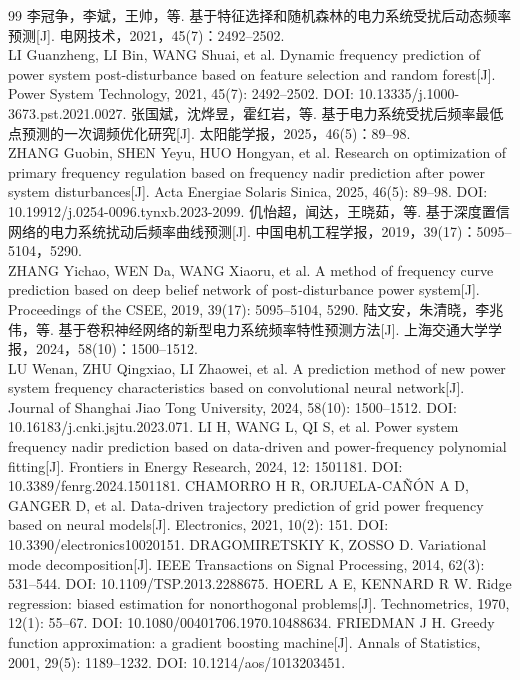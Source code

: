\documentclass[UTF8,a4paper,11pt]{ctexart}
\begin{document}
\begin{thebibliography}{99}
 李冠争，李斌，王帅，等. 基于特征选择和随机森林的电力系统受扰后动态频率预测[J]. 电网技术，2021，45(7)：2492–2502.\\
LI Guanzheng, LI Bin, WANG Shuai, et al. Dynamic frequency prediction of power system post-disturbance based on feature selection and random forest[J]. Power System Technology, 2021, 45(7): 2492–2502. DOI: 10.13335/j.1000-3673.pst.2021.0027.
 张国斌，沈烨昱，霍红岩，等. 基于电力系统受扰后频率最低点预测的一次调频优化研究[J]. 太阳能学报，2025，46(5)：89–98.\\
ZHANG Guobin, SHEN Yeyu, HUO Hongyan, et al. Research on optimization of primary frequency regulation based on frequency nadir prediction after power system disturbances[J]. Acta Energiae Solaris Sinica, 2025, 46(5): 89–98. DOI: 10.19912/j.0254-0096.tynxb.2023-2099.
 仉怡超，闻达，王晓茹，等. 基于深度置信网络的电力系统扰动后频率曲线预测[J]. 中国电机工程学报，2019，39(17)：5095–5104，5290.\\
ZHANG Yichao, WEN Da, WANG Xiaoru, et al. A method of frequency curve prediction based on deep belief network of post-disturbance power system[J]. Proceedings of the CSEE, 2019, 39(17): 5095–5104, 5290.
 陆文安，朱清晓，李兆伟，等. 基于卷积神经网络的新型电力系统频率特性预测方法[J]. 上海交通大学学报，2024，58(10)：1500–1512.\\
LU Wenan, ZHU Qingxiao, LI Zhaowei, et al. A prediction method of new power system frequency characteristics based on convolutional neural network[J]. Journal of Shanghai Jiao Tong University, 2024, 58(10): 1500–1512. DOI: 10.16183/j.cnki.jsjtu.2023.071.
 LI H, WANG L, QI S, et al. Power system frequency nadir prediction based on data-driven and power-frequency polynomial fitting[J]. Frontiers in Energy Research, 2024, 12: 1501181. DOI: 10.3389/fenrg.2024.1501181.
 CHAMORRO H R, ORJUELA-CAÑÓN A D, GANGER D, et al. Data-driven trajectory prediction of grid power frequency based on neural models[J]. Electronics, 2021, 10(2): 151. DOI: 10.3390/electronics10020151.
 DRAGOMIRETSKIY K, ZOSSO D. Variational mode decomposition[J]. IEEE Transactions on Signal Processing, 2014, 62(3): 531–544. DOI: 10.1109/TSP.2013.2288675.
 HOERL A E, KENNARD R W. Ridge regression: biased estimation for nonorthogonal problems[J]. Technometrics, 1970, 12(1): 55–67. DOI: 10.1080/00401706.1970.10488634.
 FRIEDMAN J H. Greedy function approximation: a gradient boosting machine[J]. Annals of Statistics, 2001, 29(5): 1189–1232. DOI: 10.1214/aos/1013203451.

\end{thebibliography}
\end{document}

